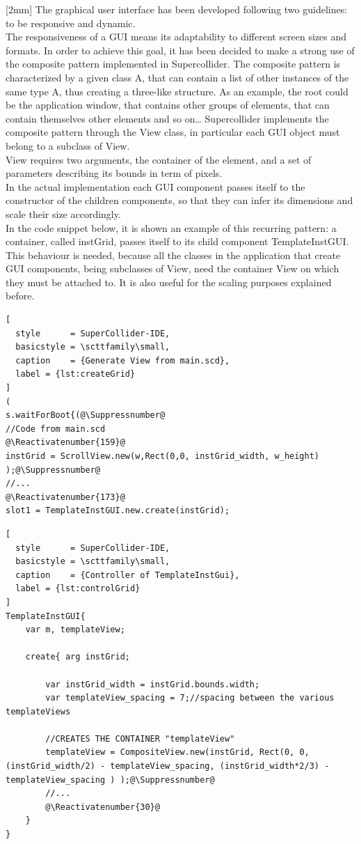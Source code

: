 \documentclass[main.tex]{subfiles}
\begin{document}
[2mm]
The graphical user interface has been developed following two guidelines: to be responsive and dynamic.\\
[2mm]
The responsiveness of a GUI means its adaptability to different screen sizes and formats. In order to achieve this goal, it has been decided to make a strong use of the composite pattern implemented in Supercollider.
The composite pattern is characterized by a given class A, that can contain a list of other instances of the same type A, thus creating a three-like structure. As an example, the root could be the application window, that contains other groups of elements, that can contain themselves other elements and so on…
Supercollider implements the composite pattern through the View class, in particular each GUI object must belong to a subclass of View.\\
[2mm]
View requires two arguments, the container of the element, and a set of parameters describing its bounds in term of pixels.\\
In the actual implementation each GUI component passes itself to the constructor of the children components, so that they can infer its dimensions and scale their size accordingly.\\
In the code snippet below, it is shown an example of this recurring pattern: a container, called instGrid, passes itself to its child component TemplateInstGUI. This behaviour is needed, because all the classes in the application that create GUI components, being subclasses of View, need the container View on which they must be attached to. It is also useful for the scaling purposes explained before.\\
[2mm]
\begin{lstlisting}[
  style      = SuperCollider-IDE,
  basicstyle = \scttfamily\small,
  caption    = {Generate View from main.scd},
  label = {lst:createGrid}
]
(
s.waitForBoot{(@\Suppressnumber@
//Code from main.scd
@\Reactivatenumber{159}@
instGrid = ScrollView.new(w,Rect(0,0, instGrid_width, w_height) );@\Suppressnumber@
//...
@\Reactivatenumber{173}@
slot1 = TemplateInstGUI.new.create(instGrid);
\end{lstlisting}

\begin{lstlisting}[
  style      = SuperCollider-IDE,
  basicstyle = \scttfamily\small,
  caption    = {Controller of TemplateInstGui},
  label = {lst:controlGrid}
]
TemplateInstGUI{
	var m, templateView;
	
	create{ arg instGrid;
		
		var instGrid_width = instGrid.bounds.width;
		var templateView_spacing = 7;//spacing between the various templateViews
		
		//CREATES THE CONTAINER "templateView"
		templateView = CompositeView.new(instGrid, Rect(0, 0, (instGrid_width/2) - templateView_spacing, (instGrid_width*2/3) - templateView_spacing ) );@\Suppressnumber@
		//...
		@\Reactivatenumber{30}@
	}
}
\end{lstlisting}
\end{document}
